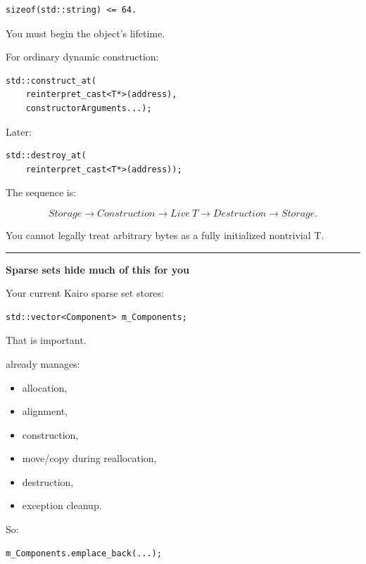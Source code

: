 \begin{verbatim}
sizeof(std::string) <= 64.
\end{verbatim}

You must begin the object's lifetime.

For ordinary dynamic construction:

\begin{verbatim}
std::construct_at(
    reinterpret_cast<T*>(address),
    constructorArguments...);
\end{verbatim}

Later:

\begin{verbatim}
std::destroy_at(
    reinterpret_cast<T*>(address));
\end{verbatim}

The sequence is:

\[
\boxed{
Storage
\rightarrow
Construction
\rightarrow
Live\ T
\rightarrow
Destruction
\rightarrow
Storage.
}
\]

You cannot legally treat arbitrary bytes as a fully initialized nontrivial T.

\begin{center}\rule{0.5\linewidth}{0.5pt}\end{center}

\textbf{Sparse sets hide much of this for you}

Your current Kairo sparse set stores:

\begin{verbatim}
std::vector<Component> m_Components;
\end{verbatim}

That is important.

 already manages:

\begin{itemize}
\tightlist
\item
  allocation,
\item
  alignment,
\item
  construction,
\item
  move/copy during reallocation,
\item
  destruction,
\item
  exception cleanup.
\end{itemize}

So:

\begin{verbatim}
m_Components.emplace_back(...);
\end{verbatim}

